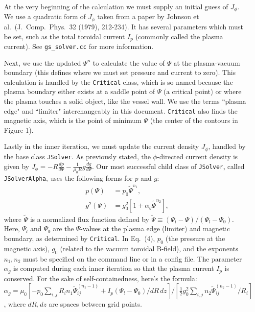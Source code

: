\documentclass[paper=letter, fontsize=11pt]{scrartcl} %
\begin{document}
At the very beginning of the calculation we must supply an initial guess of $J_{\phi}$.  We use a quadratic form of $J_{\phi}$ taken from a paper by Johnson et al.~(J.~Comp.~Phys.~32 (1979), 212-234).  It has several parameters which must be set, such as the total toroidal current $I_p$ (commonly called the plasma current).  See \texttt{gs\_solver.cc} for more information.

Next, we use the updated $\Psi^n$ to calculate the value of $\Psi$ at the plasma-vacuum boundary (this defines where we must set pressure and current to zero).  This calculation is handled by the \texttt{Critical} class, which is so named because the plasma boundary either exists at a saddle point of $\Psi$ (a critical point) or where the plasma touches a solid object, like the vessel wall. We use the terms ``plasma edge" and ``limiter" interchangeably in this document.  \texttt{Critical} also finds the magnetic axis, which is the point of minimum $\Psi$ (the center of the contours in Figure 1).  

Lastly in the inner iteration, we must update the current density $J_{\phi}$, handled by the base class \texttt{JSolver}.  As previously stated, the $\phi$-directed current density is given by $J_{\phi} = -R \frac{d p}{d \Psi} - \frac{1}{\mu_0 R} g \frac{d g}{d \Psi}$. Our most successful child class of \texttt{JSolver}, called \texttt{JSolverAlpha}, uses the following forms for $p$ and $g$:
\begin{subequations}
\begin{align}
	p(\Psi) &= p_0 \widetilde{\Psi}^{n_1},\\
          g^2(\Psi) &= g_0^2  \left[1 + \alpha_g \widetilde{\Psi}^{n_2} \right],
\end{align}
\end{subequations}
where $\widetilde{\Psi}$ is a normalized flux function defined by $\widetilde{\Psi} \equiv (\Psi_l - \Psi)/(\Psi_l - \Psi_0)$.  Here,  $\Psi_l$ and $\Psi_0$ are the $\Psi$-values at the plasma edge (limiter) and magnetic boundary, as determined by \texttt{Critical}.  In Eq.~(4), $p_0$ (the pressure at the magnetic axis), $g_0$ (related to the vacuum toroidal B-field), and the exponents $n_1,n_2$ must be specified on the command line or in a config file.  The parameter $\alpha_g$ is computed during each inner iteration so that the plasma current $I_p$ is conserved.   For the sake of self-containedness, here's the formula: $\alpha_g = \mu_0 \left[-p_0 \sum_{i,j} R_i n_1 \widetilde{\Psi}_{ij}^{(n_1-1)} + I_p (\Psi_l - \Psi_0)/dR\, dz \right] \bigg/ \left[\frac{1}{2} g_0^2 \sum_{i,j} n_2 \widetilde{\Psi}_{ij}^{(n_2-1)} / R_i\right]$, where $dR, dz$ are spaces between grid points.
\end{document}
